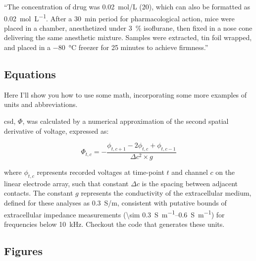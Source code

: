 \documentclass[../../main.tex]{subfiles}  %
\begin{document}


	\begin{displayquote}
		``The concentration of drug was \SI[per-mode=fraction]{0.02}{\mol/\L} (\SI{20}{\mM}), which can also be formatted as \SI[per-mode=fraction]{0.02}{\mol\per\L}.
		After a \SI{30}{\minute} period for pharmacological action, mice were placed in a chamber, anesthetized under \qty{3}{\percent} isoflurane, then fixed in a nose cone delivering the same anesthetic mixture. 
		Samples were extracted, tin foil wrapped, and placed in a \SI{-80}{\degreeCelsius} freezer for 25 minutes to achieve firmness.''
	\end{displayquote}

	\subsection{Equations}

	Here I'll show you how to use some math, incorporating some more examples of units and abbreviations.

	\Acrfull{csd}, $\Phi$, was calculated by a numerical approximation of the second spatial derivative of voltage, expressed as:

	\begin{equation}
		\Phi_{t, c} = -\frac{\phi_{t, c+1} - 2\phi_{t, c} + \phi_{t, c-1}}{\Delta c^2 \times g}
	\end{equation}

	where $\phi_{t, c}$ represents recorded voltages at time-point $t$ and channel $c$ on the linear electrode array, such that constant $\Delta c$ is the spacing between adjacent contacts. 
	The constant $g$ represents the conductivity of the extracellular medium, defined for these analyses as \SI[per-mode=fraction]{0.3}{\siemens/\m}, consistent with putative bounds of extracellular impedance measurements (\qtyrange[range-units=single,range-phrase=-]{\sim 0.3}{0.6}{\siemens\per\m}) for frequencies below \SI{10}{\kHz}. 
	Checkout the code that generates these units. 

	\subsection{Figures}
\end{document}

